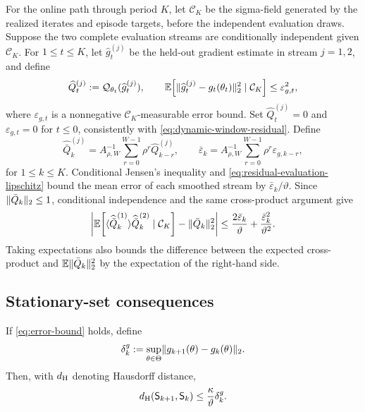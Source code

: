 For the online path through period $K$, let $\mathcal C_K$ be the sigma-field generated by the realized iterates and episode targets, before the independent evaluation draws.  Suppose the two complete evaluation streams are conditionally independent given $\mathcal C_K$.  For $1\le t\le K$, let $\widehat g_t^{(j)}$ be the held-out gradient estimate in stream $j=1,2$, and define
\[
 \widehat Q_t^{(j)}:=\mathcal Q_{\theta_t}(\widehat g_t^{(j)}),
 \qquad
 \mathbb E\!\left[\lVert\widehat g_t^{(j)}-g_t(\theta_t)\rVert_2^2
 \mid\mathcal C_K\right]\le\varepsilon_{g,t}^2,
\]
where $\varepsilon_{g,t}$ is a nonnegative $\mathcal C_K$-measurable error bound.  Set $\widehat Q_t^{(j)}=0$ and $\varepsilon_{g,t}=0$ for $t\le0$, consistently with \eqref{eq:dynamic-window-residual}.  Define
\[
 \widehat{\bar Q}_k^{(j)}
 =A_{\rho,W}^{-1}\sum_{r=0}^{W-1}\rho^r\widehat Q_{k-r}^{(j)},
 \qquad
 \bar\varepsilon_k
 =A_{\rho,W}^{-1}\sum_{r=0}^{W-1}\rho^r\varepsilon_{g,k-r},
\]
for $1\le k\le K$.  Conditional Jensen's inequality and \eqref{eq:residual-evaluation-lipschitz} bound the mean error of each smoothed stream by $\bar\varepsilon_k/\vartheta$.  Since $\lVert\bar Q_k\rVert_2\le1$, conditional independence and the same cross-product argument give
\begin{equation}\label{eq:cross-stream-dlr-error}
 \left|
 \mathbb E\!\left[\langle\widehat{\bar Q}_k^{(1)}\rangle{\widehat{\bar Q}_k^{(2)}}
 \mid\mathcal C_K\right]
 -\lVert\bar Q_k\rVert_2^2
 \right|
 \le \frac{2\bar\varepsilon_k}{\vartheta}
 +\frac{\bar\varepsilon_k^2}{\vartheta^2}.
\end{equation}
Taking expectations also bounds the difference between the expected cross-product and $\mathbb E\lVert\bar Q_k\rVert_2^2$ by the expectation of the right-hand side.

\subsection{Stationary-set consequences}

\begin{lemma}\label{lem:stationary-set-drift}
If \eqref{eq:error-bound} holds, define
\begin{equation}\label{eq:gradient-drift}
 \delta_k^g:=\sup_{\theta\in\Theta}
 \lVert g_{k+1}(\theta)-g_k(\theta)\rVert_2.
\end{equation}
Then, with $d_{\mathrm H}$ denoting Hausdorff distance,
\begin{equation}\label{eq:stationary-set-drift}
 d_{\mathrm H}(\mathsf S_{k+1},\mathsf S_k)
 \le\frac{\kappa}{\vartheta}\delta_k^g.
\end{equation}
\end{lemma}

